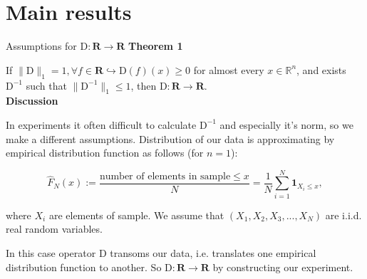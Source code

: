 \documentclass[10pt]{beamer}
\begin{document}
\section{Main results}
    \begin{frame}{Assumptions for $\text{D}: \mathbf{R} \to \mathbf{R}$}
        \large{\textcolor{myNewColorA}{\textbf{Theorem 1}}}
        \normalsize
    
        If $\|\text{D}\|_1 = 1, \forall f \in \mathbf{R} \hookrightarrow \text{D}(f)(x) \geq 0$ for almost every $x \in \mathbb{R}^n$, and exists $\text{D}^{-1}$ such that $\|\text{D}^{-1}\|_1 \leq 1$, then $\text{D} : \mathbf{R} \to \mathbf{R}$.\\
        
        \large{\textcolor{myNewColorA}{\textbf{Discussion}}}
        \normalsize
        
        In experiments it often difficult to calculate $\text{D}^{-1}$ and especially it's norm, so we make a different assumptions. Distribution of our data is approximating by empirical distribution function \cite{dvoretzky1956asymptotic} as follows (for $n=1$):
        
        \begin{equation*}
            \hat{F}_N(x) := \dfrac{\text{number of elements in sample} \leq x}{N} = \dfrac{1}{N}\sum\limits_{i=1}^N \textbf{1}_{X_i \leq x},
        \end{equation*}
        
        where $X_i$ are elements of sample. We assume that $(X_1, X_2, X_3, ... , X_N)$ are i.i.d. real random variables.
        
        In this case operator $\text{D}$ transoms our data, i.e. translates one empirical distribution function to another. So $\text{D} : \mathbf{R} \to \mathbf{R}$ by constructing our experiment.

    \end{frame}
\end{document}
